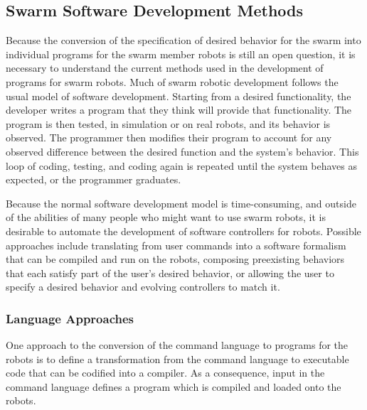 \documentclass[]{article}
\begin{document}
\subsection{Swarm Software Development Methods}

Because the conversion of the specification of desired behavior for the swarm into individual programs for the swarm member robots is still an open question, it is necessary to understand the current methods used in the development of programs for swarm robots. 
Much of swarm robotic development follows the usual model of software development. 
Starting from a desired functionality, the developer writes a program that they think will provide that functionality.
The program is then tested, in simulation or on real robots, and its behavior is observed. 
The programmer then modifies their program to account for any observed difference between the desired function and the system's behavior. 
This loop of coding, testing, and coding again is repeated until the system behaves as expected, or the programmer graduates. 

Because the normal software development model is time-consuming, and outside of the abilities of many people who might want to use swarm robots, it is desirable to automate the development of software controllers for robots. 
Possible approaches include translating from user commands into a software formalism that can be compiled and run on the robots, composing preexisting behaviors that each satisfy part of the user's desired behavior, or allowing the user to specify a desired behavior and evolving controllers to match it. 

\subsubsection {Language Approaches}

One approach to the conversion of the command language to programs for the robots is to define a transformation from the command language to executable code that can be codified into a compiler. 
As a consequence, input in the command language defines a program which is compiled and loaded onto the robots. 
\end{document}
